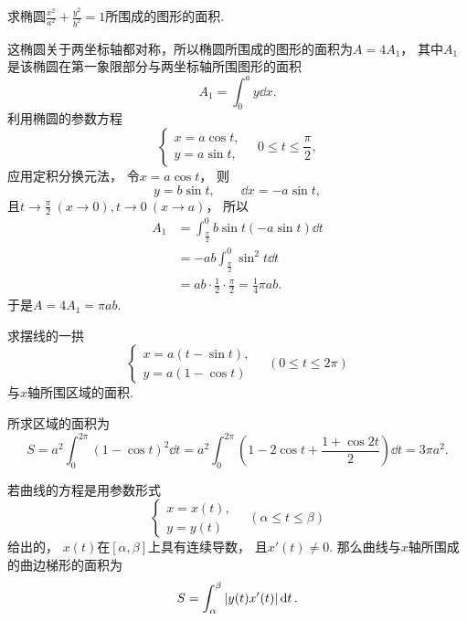 \begin{example}
求椭圆\(\frac{x^2}{a^2}+\frac{y^2}{b^2}=1\)所围成的图形的面积.
\begin{solution}
这椭圆关于两坐标轴都对称，所以椭圆所围成的图形的面积为\(A=4A_1\)，
其中\(A_1\)是该椭圆在第一象限部分与两坐标轴所围图形的面积\[
	A_1 = \int_0^a y \dd{x}.
\]
利用椭圆的参数方程\[
	\left\{ \begin{array}{l}
		x = a \cos t, \\
		y = a \sin t,
	\end{array} \right.
	\quad 0 \leq t \leq \frac\pi2,
\]
应用定积分换元法，
令\(x = a \cos t\)，
则\[
	y = b \sin t, \qquad
	\dd{x} = -a \sin t,
\]
且\(t \to \frac\pi2\ (x\to0),
t \to 0\ (x \to a)\)，
所以\begin{align*}
	A_1 &= \int_{\frac\pi2}^0 b \sin t (-a \sin t) \dd{t} \\
	&= -ab \int_{\frac\pi2}^0 \sin^2t \dd{t} \\
	&= ab \cdot \frac12 \cdot \frac\pi2
	= \frac14 \pi ab.
\end{align*}
于是\(A = 4 A_1 = \pi ab\).
\end{solution}
\end{example}

\begin{example}
求摆线的一拱\[
	\left\{ \begin{array}{l}
		x = a (t - \sin t), \\
		y = a (1 - \cos t)
	\end{array} \right.
	\quad(0 \leq t \leq 2\pi)
\]与\(x\)轴所围区域的面积.
\begin{solution}
所求区域的面积为\[
	S = a^2 \int_0^{2\pi} (1-\cos t)^2 \dd{t}
	= a^2 \int_0^{2\pi} \left(
		1 - 2 \cos t + \frac{1 + \cos2t}2
	\right) \dd{t}
	= 3\pi a^2.
\]
\end{solution}
\end{example}

若曲线的方程是用参数形式\[
	\left\{ \begin{array}{l}
		x = x(t), \\
		y = y(t)
	\end{array} \right.
	\quad(\alpha \leq t \leq \beta)
\]给出的，
\(x(t)\)在\([\alpha,\beta]\)上具有连续导数，
且\(x'(t)\neq0\).
那么曲线与\(x\)轴所围成的曲边梯形的面积为\begin{equation}
	S = \int_\alpha^\beta \abs{y(t) x'(t)} \dd{t}.
\end{equation}

